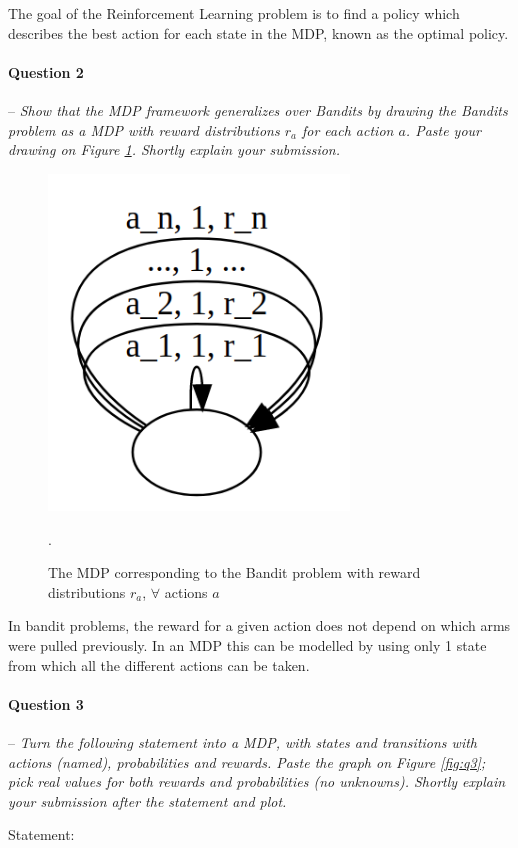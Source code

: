 \documentclass[a4paper]{article}
\newcommand{\question}[2]{
\paragraph{Question #1} -- \textit{#2}

}
\begin{document}
The goal of the Reinforcement Learning problem is to find a policy which describes the best action for each state in the MDP, known as the optimal policy.

\question{2}{Show that the MDP framework generalizes over Bandits by drawing the Bandits problem as a MDP with reward distributions $r_a$ for each action $a$. Paste your drawing on Figure \ref{fig:bandit_mdp}. Shortly explain your submission.}

\begin{figure}[H]
    \centering
    \includegraphics[width=8cm]{plots/Bandit_MDP.png}
    \caption{The MDP corresponding to the Bandit problem with reward distributions $r_a$, $\forall$ actions $a$}.
    \label{fig:bandit_mdp}
\end{figure}{}
In bandit problems, the reward for a given action does not depend on which arms were pulled previously. In an MDP this can be modelled by using only 1 state from which all the different actions can be taken.


\question{3}{Turn the following statement into a MDP, with states and transitions with actions (named), probabilities and rewards. Paste the graph on Figure \ref{fig:q3}; pick real values for both rewards and probabilities (no unknowns). Shortly explain your submission after the statement and plot.}

Statement:
\end{document}
